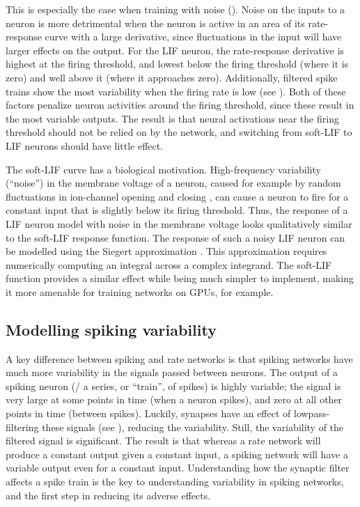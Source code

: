 This is especially the case when training with noise ().
Noise on the inputs to a neuron is more detrimental
when the neuron is active in an area of its rate-response curve with a large derivative,
since fluctuations in the input will have larger effects on the output.
For the LIF neuron, the rate-response derivative is highest at the firing threshold,
and lowest below the firing threshold (where it is zero)
and well above it (where it approaches zero).
Additionally, filtered spike trains show the most variability
when the firing rate is low (see ).
Both of these factors penalize neuron activities around the firing threshold,
since these result in the most variable outputs.
The result is that neural activations near the firing threshold
should not be relied on by the network,
and switching from soft-LIF to LIF neurons should have little effect.

The soft-LIF curve has a biological motivation.
High-frequency variability (``noise'') in the membrane voltage of a neuron,
caused for example by random fluctuations in ion-channel opening and closing
\parencite{Manwani1999},
can cause a neuron to fire for a constant input that is slightly below
its firing threshold.
Thus, the response of a LIF neuron model with noise in the membrane voltage
looks qualitatively similar to the soft-LIF response function.
The response of such a noisy LIF neuron
can be modelled using the Siegert approximation
\parencite{Siegert1951,Kreutz-Delgado2015}.
This approximation requires numerically computing an integral
across a complex integrand.
The soft-LIF function provides a similar effect
while being much simpler to implement,
making it more amenable for training networks on GPUs, for example.


\subsection{Modelling spiking variability}

A key difference between spiking and rate networks
is that spiking networks have much more variability
in the signals passed between neurons.
The output of a spiking neuron (\ie/ a series, or ``train'', of spikes)
is highly variable;
the signal is very large at some points in time (when a neuron spikes),
and zero at all other points in time (between spikes).
Luckily, synapses have an effect of lowpass-filtering these signals (see ),
reducing the variability.
Still, the variability of the filtered signal is significant.
The result is that whereas a rate network will produce a constant output
given a constant input,
a spiking network will have a variable output even for a constant input.
Understanding how the synaptic filter affects a spike train is
the key to understanding variability in spiking networks,
and the first step in reducing its adverse effects.

